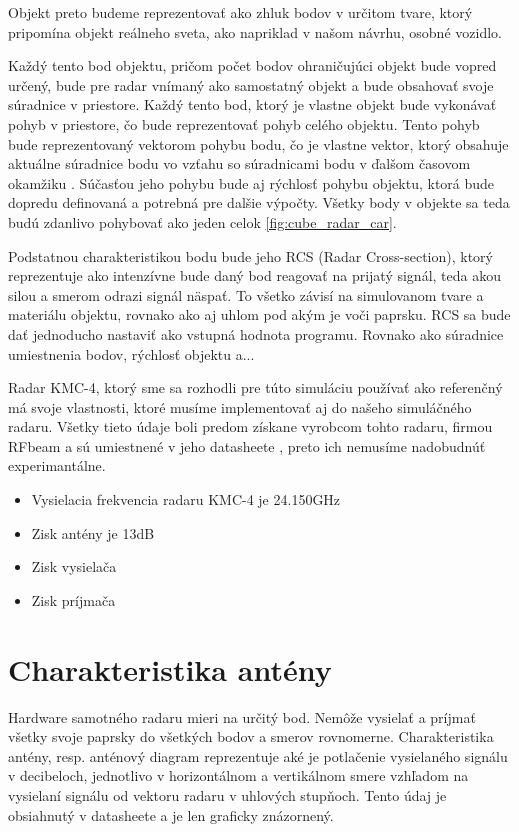 \documentclass[slovak]{ExcelAtFIT} %
\begin{document}
    Objekt preto budeme reprezentovať ako zhluk bodov v určitom tvare, ktorý pripomína objekt reálneho sveta, ako napriklad v našom návrhu, osobné vozidlo.

    Každý tento bod objektu, pričom počet bodov ohraničujúci objekt bude vopred určený, bude pre radar vnímaný ako samostatný objekt a bude obsahovať svoje súradnice v priestore.
    Každý tento bod, ktorý je vlastne objekt bude vykonávať pohyb v priestore, čo bude reprezentovať pohyb celého objektu. Tento pohyb bude reprezentovaný vektorom pohybu bodu, čo je vlastne vektor, ktorý obsahuje aktuálne súradnice bodu vo vzťahu so súradnicami bodu v ďalšom časovom okamžiku . Súčasťou jeho pohybu bude aj rýchlosť pohybu objektu, ktorá bude dopredu definovaná a potrebná pre dalšie výpočty. Všetky body v objekte sa teda budú zdanlivo pohybovať ako jeden celok \ref{fig:cube_radar_car}.

    Podstatnou charakteristikou bodu bude jeho RCS (Radar Cross-section), ktorý reprezentuje ako intenzívne bude daný bod reagovať na prijatý signál, teda akou silou a smerom odrazi signál näspať. To všetko závisí na simulovanom tvare a materiálu objektu, rovnako ako aj uhlom pod akým je voči paprsku. RCS sa bude dať jednoducho nastaviť ako vstupná hodnota programu. Rovnako ako súradnice umiestnenia bodov, rýchlosť objektu a...

	Radar KMC-4, ktorý sme sa rozhodli pre túto simuláciu používať ako referenčný má svoje vlastnosti, ktoré musíme implementovať aj do našeho simuláčného radaru. Všetky tieto údaje boli predom získane vyrobcom tohto radaru, firmou RFbeam a sú umiestnené v jeho datasheete \cite{kmc4sheet}, preto ich nemusíme nadobudnúť experimantálne.

  \begin{itemize}
    \item Vysielacia frekvencia radaru KMC-4 je 24.150GHz
    \item Zisk antény je 13dB
    \item Zisk vysielača
    \item Zisk príjmača
  \end{itemize}  

  \section{Charakteristika antény}
    Hardware samotného radaru mieri na určitý bod. Nemôže vysielať a príjmať všetky svoje paprsky do všetkých bodov a smerov rovnomerne. Charakteristika antény, resp. anténový diagram reprezentuje aké je potlačenie vysielaného signálu v decibeloch, jednotlivo v horizontálnom a vertikálnom smere vzhľadom na vysielaní signálu od vektoru radaru v uhlových stupňoch. Tento údaj je obsiahnutý v datasheete a je len graficky znázornený.
\end{document}
